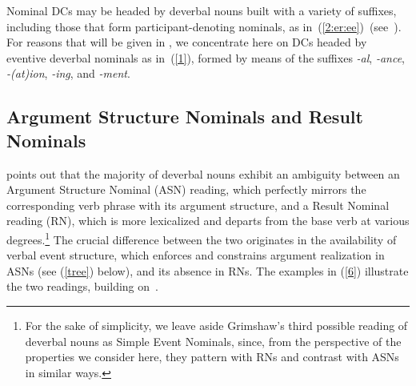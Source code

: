 \documentclass[output=paper]{langsci/langscibook}
\begin{document}
Nominal DCs may be headed by deverbal nouns built with a variety of suffixes,  {including}  those that form participant-denoting nominals, as in~(\ref{2:er:ee})~(see~\citealt[73]{lieber:16}). For reasons that 
will be given in , we concentrate here on DCs headed by eventive deverbal nominals as in~(\ref{1}), formed by means of the suffixes \textit{-al}, \textit{-ance}, \textit{-(at)ion},  \textit{-ing}, and \textit{-ment}.


\begin{exe}
\end{exe}

\subsection{Argument Structure Nominals and Result Nominals}\label{sec:lit:ASN:RN}

\cite{grimshaw:90} points out that the majority of deverbal nouns exhibit an ambiguity between an  Argument Structure Nominal  (ASN) reading, which perfectly mirrors the corresponding verb phrase with its argument structure,  and  a Result Nominal reading  (RN), which is more lexicalized and departs from the base verb at various degrees.\footnote{For the sake of simplicity, we leave aside Grimshaw's third possible reading of deverbal nouns as Simple Event Nominals, since, from the perspective of the properties we consider here, they pattern with RNs and contrast with ASNs in similar ways.} The crucial difference between the two originates in the availability of verbal event structure,  which enforces and constrains argument realization in ASNs (see (\ref{tree}) below), and its absence in RNs. The examples in (\ref{6}) illustrate the two readings, building on~\citet[49]{grimshaw:90}.

\begin{exe}
\end{exe}
\end{document}
